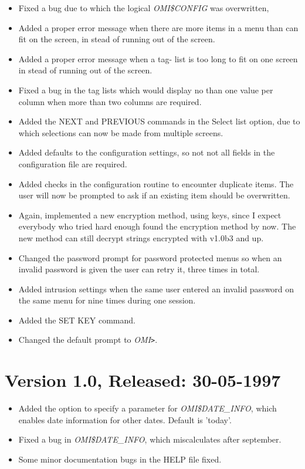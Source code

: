 \documentclass[a4paper]{book}
\newcommand{\gt}{\texttt{>}}
\begin{document}
\begin{itemize}
\item Fixed a bug due to which the logical \textsl{OMI{\$}CONFIG} was overwritten,
\item Added a proper error message when there are more items in a menu than can fit on the screen, in stead of running out of the screen.
\item Added a proper error message when a tag- list is too long to fit on one screen in stead of running out of the screen.
\item Fixed a bug in the tag lists which would display no than one value per column when more than two columns are required.
\item Added the \textsf{NEXT} and \textsf{PREVIOUS} commands in the Select list option, due to which selections can now be made from multiple screens.
\item Added defaults to the configuration settings, so not not all fields in the configuration file are required.
\item Added checks in the configuration routine to encounter duplicate items. The user will now be prompted to ask if an existing item should be overwritten.
\item Again, implemented a new encryption method, using keys, since I expect everybody who tried hard enough found the encryption method by now. The new method can still decrypt strings encrypted with v1.0b3 and up.
\item Changed the password prompt for password protected menus so when an invalid password is given the user can retry it, three times in total.
\item Added intrusion settings when the same user entered an invalid password on the same menu for nine times during one session.
\item Added the \textsf{SET KEY} command.
\item Changed the default prompt to \textsl{OMI\gt}.
\end{itemize}

\section*{Version 1.0, Released: 30-05-1997}

\begin{itemize}
\item Added the option to specify a parameter for \textsl{OMI{\$}DATE{\_}INFO}, which enables date information for other dates. Default is 'today'.
\item Fixed a bug in \textsl{OMI{\$}DATE{\_}INFO}, which miscalculates after september.
\item Some minor documentation bugs in the \textsf{HELP} file fixed.
\end{itemize}
\end{document}
